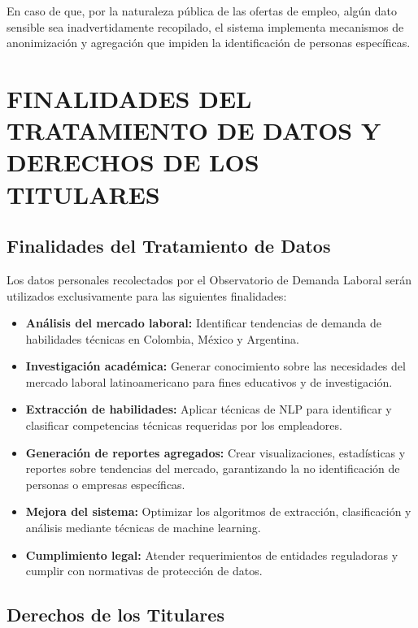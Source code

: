 \documentclass[11pt,oneside,letterpaper]{article}
\begin{document}
En caso de que, por la naturaleza pública de las ofertas de empleo, algún dato sensible sea inadvertidamente recopilado, el sistema implementa mecanismos de anonimización y agregación que impiden la identificación de personas específicas.

\newpage

\section{FINALIDADES DEL TRATAMIENTO DE DATOS Y DERECHOS DE LOS TITULARES}

\subsection{Finalidades del Tratamiento de Datos}

Los datos personales recolectados por el Observatorio de Demanda Laboral serán utilizados exclusivamente para las siguientes finalidades:

\begin{itemize}
    \item \textbf{Análisis del mercado laboral:} Identificar tendencias de demanda de habilidades técnicas en Colombia, México y Argentina.
    \item \textbf{Investigación académica:} Generar conocimiento sobre las necesidades del mercado laboral latinoamericano para fines educativos y de investigación.
    \item \textbf{Extracción de habilidades:} Aplicar técnicas de NLP para identificar y clasificar competencias técnicas requeridas por los empleadores.
    \item \textbf{Generación de reportes agregados:} Crear visualizaciones, estadísticas y reportes sobre tendencias del mercado, garantizando la no identificación de personas o empresas específicas.
    \item \textbf{Mejora del sistema:} Optimizar los algoritmos de extracción, clasificación y análisis mediante técnicas de machine learning.
    \item \textbf{Cumplimiento legal:} Atender requerimientos de entidades reguladoras y cumplir con normativas de protección de datos.
\end{itemize}

\subsection{Derechos de los Titulares}
\end{document}
